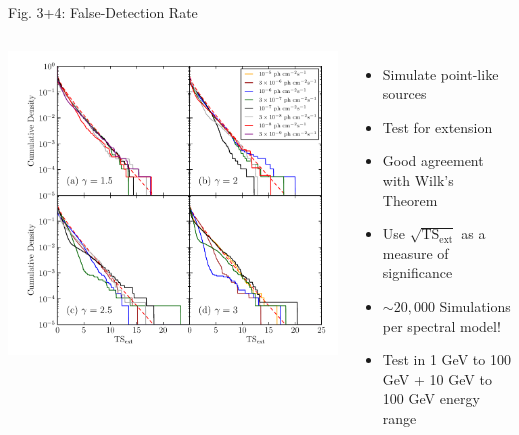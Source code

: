 \documentclass[12pt]{beamer}
\begin{document}
\begin{frame}{Fig. 3+4: False-Detection Rate}
  \begin{columns}
    \includegraphics[scale=0.4]{plots/ts_ext_emin_1000_color.pdf}
    \begin{itemize}
      \item Simulate point-like sources
      \item Test for extension
      \item Good agreement with Wilk's Theorem
      \item Use $\sqrt{\mathrm{TS}_\mathrm{ext}}$
        as a measure of significance
      \item $\sim 20,000$ Simulations per spectral model!
      \item Test in 1 GeV to 100 GeV + 10 GeV to 100 GeV
        energy range
    \end{itemize}
  \end{columns}
\end{frame}
\end{document}
